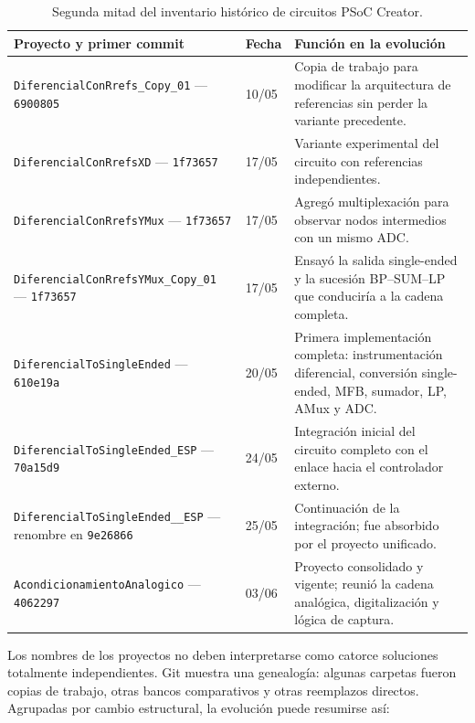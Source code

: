 \begin{table}[ht]
\centering
\scriptsize
\caption{Segunda mitad del inventario hist\'orico de circuitos PSoC Creator.}
\label{tab:git-circuitos-b}
\begin{tabularx}{\textwidth}{@{}>{\raggedright\arraybackslash}p{} p{} Y@{}}
\toprule
\textbf{Proyecto y primer commit} & \textbf{Fecha} & \textbf{Funci\'on en la evoluci\'on} \\
\midrule
\texttt{DiferencialConRrefs\_Copy\_01} --- \texttt{6900805} & 10/05 & Copia de trabajo para modificar la arquitectura de referencias sin perder la variante precedente. \\
\texttt{DiferencialConRrefsXD} --- \texttt{1f73657} & 17/05 & Variante experimental del circuito con referencias independientes. \\
\texttt{DiferencialConRrefsYMux} --- \texttt{1f73657} & 17/05 & Agreg\'o multiplexaci\'on para observar nodos intermedios con un mismo ADC. \\
\texttt{DiferencialConRrefsYMux\_Copy\_01} --- \texttt{1f73657} & 17/05 & Ensay\'o la salida single-ended y la sucesi\'on BP--SUM--LP que conducir\'ia a la cadena completa. \\
\texttt{DiferencialToSingleEnded} --- \texttt{610e19a} & 20/05 & Primera implementaci\'on completa: instrumentaci\'on diferencial, conversi\'on single-ended, MFB, sumador, LP, AMux y ADC. \\
\texttt{DiferencialToSingleEnded\_ESP} --- \texttt{70a15d9} & 24/05 & Integraci\'on inicial del circuito completo con el enlace hacia el controlador externo. \\
\texttt{DiferencialToSingleEnded\_\_ESP} --- renombre en \texttt{9e26866} & 25/05 & Continuaci\'on de la integraci\'on; fue absorbido por el proyecto unificado. \\
\texttt{AcondicionamientoAnalogico} --- \texttt{4062297} & 03/06 & Proyecto consolidado y vigente; reuni\'o la cadena anal\'ogica, digitalizaci\'on y l\'ogica de captura. \\
\bottomrule
\end{tabularx}
\end{table}

Los nombres de los proyectos no deben interpretarse como catorce soluciones totalmente
independientes. Git muestra una genealog\'ia: algunas carpetas fueron copias de trabajo,
otras bancos comparativos y otras reemplazos directos. Agrupadas por cambio estructural,
la evoluci\'on puede resumirse as\'i:

